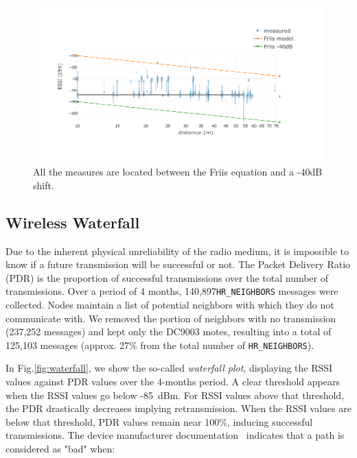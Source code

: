 \documentclass{sig-alternate}
\newcommand{\HRNEIGHBORS}         {{\tt HR\_NEIGHBORS}\xspace}
\newcommand{\NUMHRNEIGHBORS}      {140,897}
\begin{document}
\begin{figure}
    \centering
    \includegraphics[width=\columnwidth]{pister_hack}
    \caption{All the measures are located between the Friis equation and a -40dB shift.}
    \label{fig:pister_hack}
\end{figure}

\subsection{Wireless Waterfall}
\label{sec:waterfall}


Due to the inherent physical unreliability of the radio medium, it is impossible to know if a future transmission will be successful or not.
The Packet Delivery Ratio (PDR) is the proportion of successful transmissions over the total number of transmissions.
Over a period of 4 months, \NUMHRNEIGHBORS \HRNEIGHBORS messages were collected.
Nodes maintain a list of potential neighbors with which they do not communicate with.
We removed the portion of neighbors with no transmission (237,252 messages) and kept only the DC9003 motes, resulting into a total of 125,103 messages (approx. 27\% from the total number of \HRNEIGHBORS).


In Fig.\ref{fig:waterfall}, we show the so-called \textit{waterfall plot}, displaying the RSSI values against PDR values over the 4-months period.
A clear threshold appears when the RSSI values go below -85~dBm.
For RSSI values above that threshold, the PDR drastically decreases implying retransmission.
When the RSSI values are below that threshold, PDR values remain near 100\%, inducing successful transmissions.
The device manufacturer documentation~\cite{smip_app_note} indicates that a path is considered as "bad" when:
\end{document}

